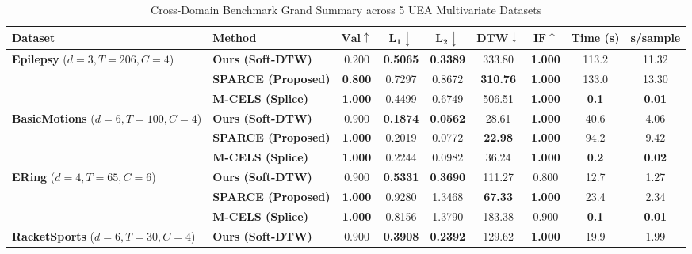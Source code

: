 \documentclass[conference]{IEEEtran}
\begin{document}
\begin{table}[!t]
\caption{Cross-Domain Benchmark Grand Summary across 5 UEA Multivariate Datasets}
\label{tab:multivariate_grand}
\centering
\footnotesize
\setlength{\tabcolsep}{5.0pt}
\renewcommand{\arraystretch}{0.95}
\begin{tabular}{llccccccc}
\toprule
\textbf{Dataset} & \textbf{Method} & $\mathbf{Val} \uparrow$ & $\mathbf{L_1} \downarrow$ & $\mathbf{L_2} \downarrow$ & $\mathbf{DTW} \downarrow$ & $\mathbf{IF} \uparrow$ & \textbf{Time (s)} & \textbf{s/sample} \\
\midrule
\multirow{3}{*}{\textbf{Epilepsy} ($d=3, T=206, C=4$)}
& \textbf{Ours (Soft-DTW)} & 0.200 & \textbf{0.5065} & \textbf{0.3389} & 333.80 & \textbf{1.000} & 113.2 & 11.32 \\
& \textbf{SPARCE (Proposed)} & \textbf{0.800} & 0.7297 & 0.8672 & \textbf{310.76} & \textbf{1.000} & 133.0 & 13.30 \\
& \textbf{M-CELS (Splice)} & \textbf{1.000} & 0.4499 & 0.6749 & 506.51 & \textbf{1.000} & \textbf{0.1} & \textbf{0.01} \\
\midrule
\multirow{3}{*}{\textbf{BasicMotions} ($d=6, T=100, C=4$)}
& \textbf{Ours (Soft-DTW)} & 0.900 & \textbf{0.1874} & \textbf{0.0562} & 28.61 & \textbf{1.000} & 40.6 & 4.06 \\
& \textbf{SPARCE (Proposed)} & \textbf{1.000} & 0.2019 & 0.0772 & \textbf{22.98} & \textbf{1.000} & 94.2 & 9.42 \\
& \textbf{M-CELS (Splice)} & \textbf{1.000} & 0.2244 & 0.0982 & 36.24 & \textbf{1.000} & \textbf{0.2} & \textbf{0.02} \\
\midrule
\multirow{3}{*}{\textbf{ERing} ($d=4, T=65, C=6$)}
& \textbf{Ours (Soft-DTW)} & 0.900 & \textbf{0.5331} & \textbf{0.3690} & 111.27 & 0.800 & 12.7 & 1.27 \\
& \textbf{SPARCE (Proposed)} & \textbf{1.000} & 0.9280 & 1.3468 & \textbf{67.33} & \textbf{1.000} & 23.4 & 2.34 \\
& \textbf{M-CELS (Splice)} & \textbf{1.000} & 0.8156 & 1.3790 & 183.38 & 0.900 & \textbf{0.1} & \textbf{0.01} \\
\midrule
\multirow{3}{*}{\textbf{RacketSports} ($d=6, T=30, C=4$)}
& \textbf{Ours (Soft-DTW)} & 0.900 & \textbf{0.3908} & \textbf{0.2392} & 129.62 & \textbf{1.000} & 19.9 & 1.99 \\

\end{tabular}
\end{table}
\end{document}
